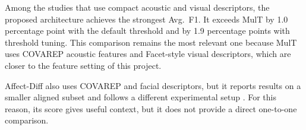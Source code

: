 \begin{table}[H]
\centering
\caption{Comparison with published results on CMU-MOSEI six-emotion recognition.}
\label{tab:lit_comparison}
\end{table}

Among the studies that use compact acoustic and visual descriptors, the proposed architecture achieves the strongest Avg.~F1. It exceeds MulT by 1.0 percentage point with the default threshold and by 1.9 percentage points with threshold tuning. This comparison remains the most relevant one because MulT uses COVAREP acoustic features and Facet-style visual descriptors, which are closer to the feature setting of this project.

Affect-Diff also uses COVAREP and facial descriptors, but it reports results on a smaller aligned subset and follows a different experimental setup \cite{sanjyal2026affectdiff}. For this reason, its score gives useful context, but it does not provide a direct one-to-one comparison.


